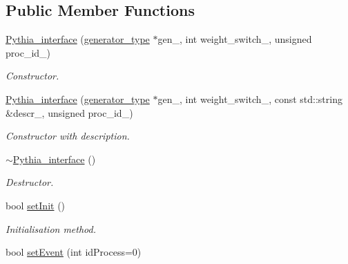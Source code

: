 \subsection*{Public Member Functions}
\begin{DoxyCompactItemize}
\item 
\hypertarget{a00459_aa709b8e8985924f31009362fd72d6058}{}\hyperlink{a00459_aa709b8e8985924f31009362fd72d6058}{Pythia\+\_\+interface} (\hyperlink{a00451}{generator\+\_\+type} $\ast$gen\+\_\+, int weight\+\_\+switch\+\_\+, unsigned proc\+\_\+id\+\_)\label{a00459_aa709b8e8985924f31009362fd72d6058}

\begin{DoxyCompactList}\small\item\em Constructor. \end{DoxyCompactList}\item 
\hypertarget{a00459_a2e93c96da887e8348895c8274b4a903f}{}\hyperlink{a00459_a2e93c96da887e8348895c8274b4a903f}{Pythia\+\_\+interface} (\hyperlink{a00451}{generator\+\_\+type} $\ast$gen\+\_\+, int weight\+\_\+switch\+\_\+, const std\+::string \&descr\+\_\+, unsigned proc\+\_\+id\+\_)\label{a00459_a2e93c96da887e8348895c8274b4a903f}

\begin{DoxyCompactList}\small\item\em Constructor with description. \end{DoxyCompactList}\item 
\hypertarget{a00459_a7359fb2cc840e404123f7f9c0b2b8644}{}\hyperlink{a00459_a7359fb2cc840e404123f7f9c0b2b8644}{$\sim$\+Pythia\+\_\+interface} ()\label{a00459_a7359fb2cc840e404123f7f9c0b2b8644}

\begin{DoxyCompactList}\small\item\em Destructor. \end{DoxyCompactList}\item 
\hypertarget{a00459_a6201668b13598907935b475787093d6b}{}bool \hyperlink{a00459_a6201668b13598907935b475787093d6b}{set\+Init} ()\label{a00459_a6201668b13598907935b475787093d6b}

\begin{DoxyCompactList}\small\item\em Initialisation method. \end{DoxyCompactList}\item 
\hypertarget{a00459_add10b51132c584d44b961cc45e81fa78}{}bool \hyperlink{a00459_add10b51132c584d44b961cc45e81fa78}{set\+Event} (int id\+Process=0)\label{a00459_add10b51132c584d44b961cc45e81fa78}


\end{DoxyCompactItemize}
